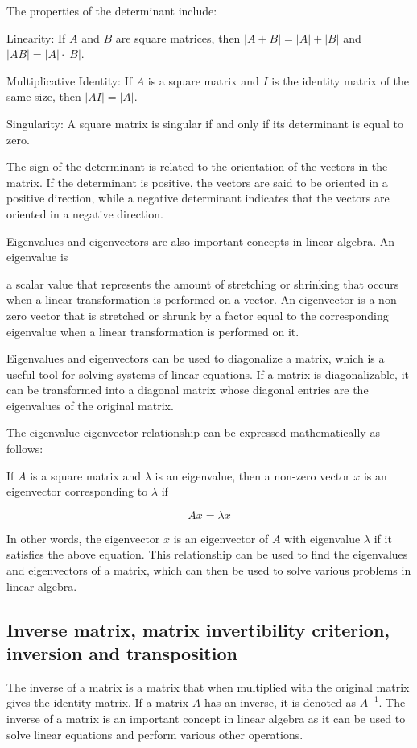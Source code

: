 \documentclass[12pt, a4paper, oneside]{article}
\begin{document}
The properties of the determinant include:

Linearity: If $A$ and $B$ are square matrices, then $|A + B| = |A| + |B|$ and $|AB| = |A| \cdot |B|$.

Multiplicative Identity: If $A$ is a square matrix and $I$ is the identity matrix of the same size, then $|AI| = |A|$.

Singularity: A square matrix is singular if and only if its determinant is equal to zero.

The sign of the determinant is related to the orientation of the vectors in the matrix. If the determinant is positive, the vectors are said to be oriented in a positive direction, while a negative determinant indicates that the vectors are oriented in a negative direction.

Eigenvalues and eigenvectors are also important concepts in linear algebra. An eigenvalue is

a scalar value that represents the amount of stretching or shrinking that occurs when a linear transformation is performed on a vector. An eigenvector is a non-zero vector that is stretched or shrunk by a factor equal to the corresponding eigenvalue when a linear transformation is performed on it.

Eigenvalues and eigenvectors can be used to diagonalize a matrix, which is a useful tool for solving systems of linear equations. If a matrix is diagonalizable, it can be transformed into a diagonal matrix whose diagonal entries are the eigenvalues of the original matrix.

The eigenvalue-eigenvector relationship can be expressed mathematically as follows:

If $A$ is a square matrix and $\lambda$ is an eigenvalue, then a non-zero vector $x$ is an eigenvector corresponding to $\lambda$ if

$$A x = \lambda x$$

In other words, the eigenvector $x$ is an eigenvector of $A$ with eigenvalue $\lambda$ if it satisfies the above equation. This relationship can be used to find the eigenvalues and eigenvectors of a matrix, which can then be used to solve various problems in linear algebra.

\subsection{ Inverse matrix, matrix invertibility criterion, inversion and transposition }
The inverse of a matrix is a matrix that when multiplied with the original matrix gives the identity matrix. If a matrix $A$ has an inverse, it is denoted as $A^{-1}$. The inverse of a matrix is an important concept in linear algebra as it can be used to solve linear equations and perform various other operations.
\end{document}
